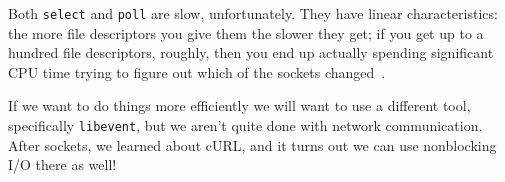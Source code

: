 Both \texttt{select} and \texttt{poll} are slow, unfortunately. They have linear characteristics: the more file descriptors you give them the slower they get; if you get up to a hundred file descriptors, roughly, then you end up actually spending significant CPU time trying to figure out which of the sockets changed~\cite{pollvselect}. 

If we want to do things more efficiently we will want to use a different tool, specifically \texttt{libevent}, but we aren't quite done with network communication. After sockets, we learned about cURL, and it turns out we can use nonblocking I/O there as well!





